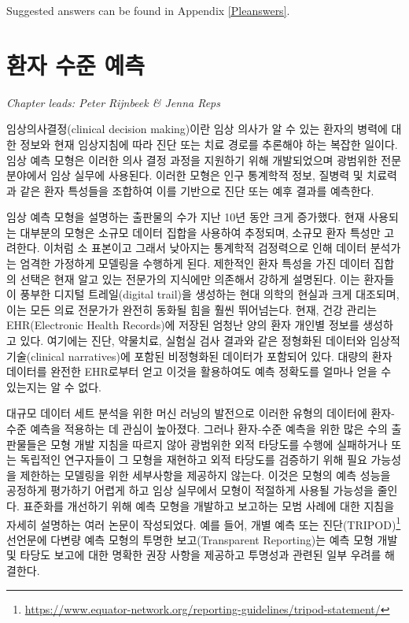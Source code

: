 \documentclass[11pt]{book}
\let\rmarkdownfootnote\footnote%
\def\footnote{\protect\rmarkdownfootnote}
\theoremstyle{definition}
\theoremstyle{definition}
\theoremstyle{definition}
\theoremstyle{remark}
\begin{document}
Suggested answers can be found in Appendix \ref{Pleanswers}.

\chapter{환자 수준 예측}\label{PatientLevelPrediction}

\emph{Chapter leads: Peter Rijnbeek \& Jenna Reps}


임상의사결정(clinical decision making)이란 임상 의사가 알 수 있는 환자의
병력에 대한 정보와 현재 임상지침에 따라 진단 또는 치료 경로를 추론해야
하는 복잡한 일이다. 임상 예측 모형은 이러한 의사 결정 과정을 지원하기
위해 개발되었으며 광범위한 전문 분야에서 임상 실무에 사용된다. 이러한
모형은 인구 통계학적 정보, 질병력 및 치료력과 같은 환자 특성들을
조합하여 이를 기반으로 진단 또는 예후 결과를 예측한다.
 

임상 예측 모형을 설명하는 출판물의 수가 지난 10년 동안 크게 증가했다.
현재 사용되는 대부분의 모형은 소규모 데이터 집합을 사용하여 추정되며,
소규모 환자 특성만 고려한다. 이처럼 소 표본이고 그래서 낮아지는 통계학적
검정력으로 인해 데이터 분석가는 엄격한 가정하게 모델링을 수행하게 된다.
제한적인 환자 특성을 가진 데이터 집합의 선택은 현재 알고 있는 전문가의
지식에만 의존해서 강하게 설명된다. 이는 환자들이 풍부한 디지털
트레일(digital trail)을 생성하는 현대 의학의 현실과 크게 대조되며, 이는
모든 의료 전문가가 완전히 동화될 힘을 훨씬 뛰어넘는다. 현재, 건강 관리는
EHR(Electronic Health Records)에 저장된 엄청난 양의 환자 개인별 정보를
생성하고 있다. 여기에는 진단, 약물치료, 실험실 검사 결과와 같은 정형화된
데이터와 임상적 기술(clinical narratives)에 포함된 비정형화된 데이터가
포함되어 있다. 대량의 환자 데이터를 완전한 EHR로부터 얻고 이것을
활용하여도 예측 정확도를 얼마나 얻을 수 있는지는 알 수 없다.

대규모 데이터 세트 분석을 위한 머신 러닝의 발전으로 이러한 유형의
데이터에 환자-수준 예측을 적용하는 데 관심이 높아졌다. 그러나 환자-수준
예측을 위한 많은 수의 출판물들은 모형 개발 지침을 따르지 않아 광범위한
외적 타당도를 수행에 실패하거나 또는 독립적인 연구자들이 그 모형을
재현하고 외적 타당도를 검증하기 위해 필요 가능성을 제한하는 모델링을
위한 세부사항을 제공하지 않는다. 이것은 모형의 예측 성능을 공정하게
평가하기 어렵게 하고 임상 실무에서 모형이 적절하게 사용될 가능성을
줄인다. 표준화를 개선하기 위해 예측 모형을 개발하고 보고하는 모범 사례에
대한 지침을 자세히 설명하는 여러 논문이 작성되었다. 예를 들어, 개별 예측
또는 진단(TRIPOD)\footnote{\url{https://www.equator-network.org/reporting-guidelines/tripod-statement/}}
선언문에 다변량 예측 모형의 투명한 보고(Transparent Reporting)는 예측
모형 개발 및 타당도 보고에 대한 명확한 권장 사항을 제공하고 투명성과
관련된 일부 우려를 해결한다.  
\end{document}

